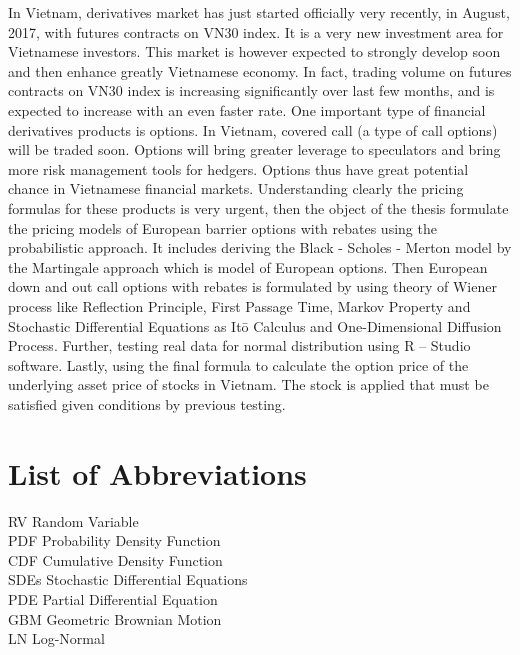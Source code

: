 \documentclass[12pt,a4paper,left=2cm,right=2cm,oneside,titlepage]{report}
\numberwithin{equation}{section}
\begin{document}
\fontsize{11pt}{20pt}\selectfont  In Vietnam, derivatives market has just started officially very recently, in August, 2017, with futures contracts on VN30 index. It is a very new investment area for Vietnamese investors. This market is however expected to strongly develop soon and then enhance greatly Vietnamese economy. In fact, trading volume on futures contracts on VN30 index is increasing significantly over last few months, and is expected to increase with an even faster rate. One important type of financial derivatives products is options. In Vietnam, covered call (a type of call options) will be traded soon. Options will bring greater leverage to speculators and bring more risk management tools for hedgers. Options thus have great potential chance in Vietnamese financial markets. Understanding clearly the pricing formulas for these products is very urgent, then the object of the thesis formulate the pricing models of European barrier options with rebates using the probabilistic approach. It includes deriving the Black - Scholes - Merton model by the Martingale approach which is model of European options. Then European down and out call options with rebates is formulated by using theory of Wiener process like Reflection Principle, First Passage Time, Markov Property and Stochastic Differential Equations as It\=o Calculus and One-Dimensional Diffusion Process. Further, testing real data for normal distribution using R – Studio software. Lastly, using the final formula to calculate the option price of the underlying asset price of stocks in Vietnam. The stock is applied that must be satisfied given conditions by previous testing. 

	\tableofcontents
	\listoffigures
	\listoftables
	
	\clearpage
	\chapter*{List of Abbreviations}
	
	RV \hspace{1cm} Random Variable\\[0.2cm]
	PDF \hspace{0.7cm} Probability Density Function\\[0.2cm]
	CDF \hspace{0.7cm} Cumulative Density Function\\[0.2cm]
	SDEs \hspace{0.7cm} Stochastic Differential Equations\\[0.2cm]
	PDE \hspace{0.7cm} Partial Differential Equation\\[0.2cm]
	GBM \hspace{0.6cm} Geometric Brownian Motion\\[0.2cm]
	LN \hspace{1cm} Log-Normal
	 
\end{document}
